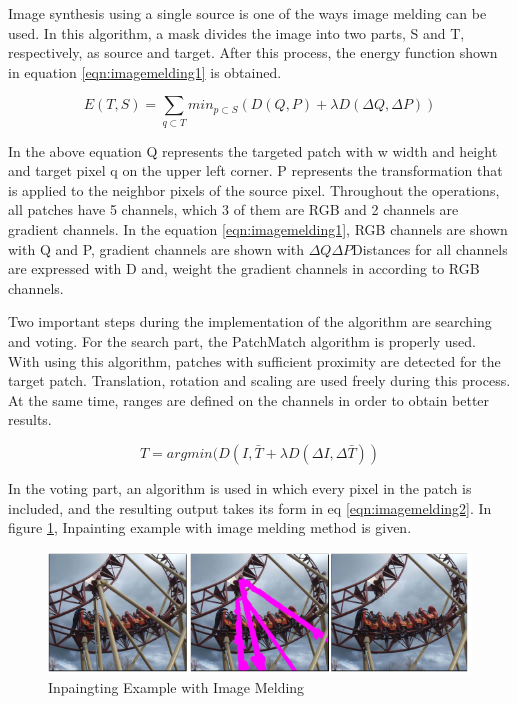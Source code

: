 Image synthesis using a single source is one of the ways image melding can be used. In this algorithm, a mask divides the image into two parts, S and T, respectively, as source and target. After this process, the energy function shown in equation \ref{eqn:imagemelding1} is obtained.

\begin{equation}
    \label{eqn:imagemelding1}
    E(T,S) = \sum\limits_{q\subset T}{min_{p\subset S}(D(Q,P)+\lambda D(\Delta Q, \Delta P))}
\end{equation}

In the above equation Q represents the targeted patch with w width and height and target pixel q on the upper left corner. P represents the transformation that is applied to the neighbor pixels of the source pixel. Throughout the operations, all patches have 5 channels, which 3 of them are RGB and 2 channels are gradient channels. In the equation \ref{eqn:imagemelding1}, RGB channels are shown with Q and P, gradient channels are shown with \(\Delta Q \Delta P \)Distances for all channels are expressed with D and,  weight the gradient channels in according to RGB channels.

Two important steps during the implementation of the algorithm are searching and voting. For the search part, the PatchMatch algorithm is properly used. With using this algorithm, patches with sufficient proximity are detected for the target patch. Translation, rotation and scaling are used freely during this process. At the same time, ranges are defined on the channels in order to obtain better results.

\begin{equation}
    \label{eqn:imagemelding2}
    T= argmin(D(I,\bar{T}+\lambda D(\Delta I,\Delta \bar{T}))
\end{equation}

In the voting part, an algorithm is used in which every pixel in the patch is included, and the resulting output takes its form in eq \ref{eqn:imagemelding2}. In figure \ref{fig:inpainting-image-melding}, Inpainting example with image melding method is given.

\begin{figure}[h]
    \centering
    \includegraphics{figures/chapter2/ImageMeldingExample.png}
    \vspace*{5mm}
    \caption{Inpaingting Example with Image Melding\cite{imagemelding}}
    \label{fig:inpainting-image-melding}
\end{figure}

